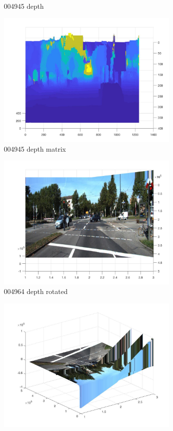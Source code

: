 \documentclass{csc_assignment4}
\begin{document}
\begin{description}
\begin{enumerate}[label=(\alph*)]
\begin{figure}
\caption{004945 depth}
\end{figure}
\begin{figure}
\includegraphics[width=0.8\textwidth, center]{data/a4q1c/004945.jpg}
\vspace*{-5mm}
\caption{004945 depth matrix}
\end{figure}
\begin{figure}
\includegraphics[width=0.8\textwidth, center]{data/a4q1c/004964_depth.jpg}
\vspace*{-5mm}
\caption{004964 depth rotated}
\end{figure}
\begin{figure}
\includegraphics[width=0.8\textwidth, center]{data/a4q1c/004964_depth_rotated.jpg}

\end{figure}
\end{enumerate}
\end{description}
\end{document}
